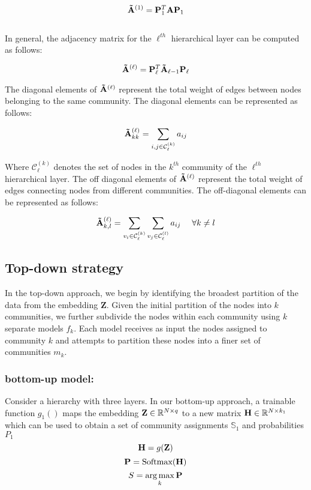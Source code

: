 \documentclass[a4paper,12pt]{article}
\DeclareMathOperator*{\argmax}{arg\,max}
\begin{document}
					\[ {\bf \tilde A}^{(1)} = {\bf P}_1^T{\bf A}{\bf P}_1\]\\
					
					In general, the adjacency matrix for the $\ell^{th}$ hierarchical layer can be computed as follows:
					
					\[ {\bf \tilde A}^{(\ell)} = {\bf P}_\ell^T{\bf \tilde{A}}_{\ell-1}{\bf P}_\ell \] 
					
					The diagonal elements of ${\bf \tilde{A}}^{(\ell)}$ represent the total weight of edges between nodes belonging to the same community. The diagonal elements can be represented as follows: 
					 
					\[ {\bf \tilde A}_{kk}^{(\ell)} = \sum_{i,j\in \mathcal{C}_\ell^{(k)}} a_{ij} \]
					
					Where $\mathcal{C}_\ell^{(k)}$ denotes the set of nodes in the $k^{th}$ community of the $\ell^{th}$ hierarchical layer. The off diagonal elements of ${\bf \tilde{A}}^{(\ell)}$ represent the total weight of edges connecting nodes from different communities. The off-diagonal elements can be represented as follows:
					
					\[ {\bf \tilde A}_{k,l}^{(\ell)} =\sum_{v_i\in \mathcal{C}_\ell^{(k)}}\sum_{v_j\in \mathcal{C}_\ell^{(l)}} a_{ij}  \ \ \ \ \forall k\neq l\] 
			
			
			
			\subsection{Top-down strategy}
			In the top-down approach, we begin by identifying the broadest partition of the data from the embedding $\mathbf{Z}$. Given the initial partition of the nodes into $k$ communities, we further subdivide the nodes within each community using $k$ separate models $f_k$. Each model receives as input the nodes assigned to community $k$ and attempts to partition these nodes into a finer set of communities $m_k$.
			
			\subsubsection*{bottom-up model:} 
			
			Consider a hierarchy with three layers. In our bottom-up approach, a trainable function $g_1()$ maps the embedding ${\bf Z} \in \mathbb{R}^{N\times q}$ to a new matrix ${\bf H} \in \mathbb{R}^{N\times k_1}$ which can be used to obtain a set of community assignments $\mathbb{S}_1$ and probabilities $P_1$
			\[{\bf H} = g({\bf Z}) \]
			\[ \mathbf{P} = \text{Softmax}({\bf H})\]
			\[ S = \argmax_{k} {\bf P}\]
			
\end{document}
